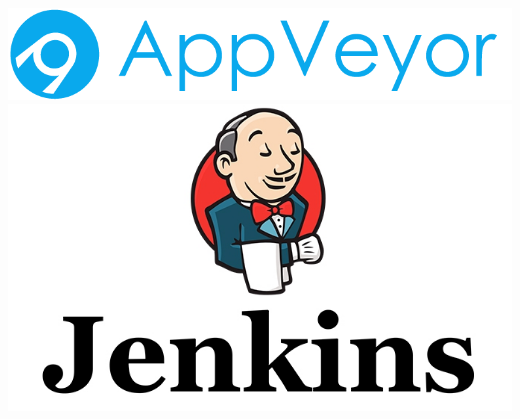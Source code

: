 \documentclass[accentcolor=tud1b,colorbacktitle,landscape,german,presentation]{tudbeamer}
\begin{document}
\begin{frame}
	\hspace{0.1cm}
	\includegraphics[scale=0.2]{appveyor}
	\includegraphics[scale=0.18]{jenkins}
\end{frame}
\end{document}

